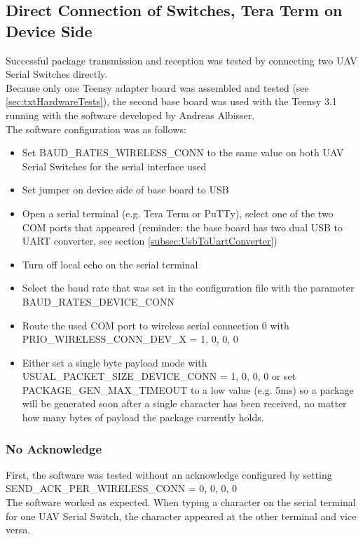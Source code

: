 \subsection{Direct Connection of Switches, Tera Term on Device Side} \label{subsec:txtTestDirectConnTeraTerm}
%
Successful package transmission and reception was tested by connecting two UAV Serial Switches directly.\\
Because only one Teensy adapter board was assembled and tested (see \autoref{sec:txtHardwareTests}), the second base board was used with the Teensy 3.1 running with the software developed by Andreas Albisser.\\
The software configuration was as follows:
\begin{itemize}
    \item Set BAUD\_RATES\_WIRELESS\_CONN to the same value on both UAV Serial Switches for the serial interface used
    \item Set jumper on device side of base board to USB
    \item Open a serial terminal (e.g. Tera Term or PuTTy), select one of the two COM ports that appeared (reminder: the base board has two dual USB to UART converter, see section \ref{subsec:UsbToUartConverter})
    \item Turn off local echo on the serial terminal
    \item Select the baud rate that was set in the configuration file with the parameter BAUD\_RATES\_DEVICE\_CONN
    \item Route the used COM port to wireless serial connection 0 with PRIO\_WIRELESS\_CONN\_DEV\_X = 1, 0, 0, 0
    \item Either set a single byte payload mode with USUAL\_PACKET\_SIZE\_DEVICE\_CONN = 1, 0, 0, 0 or set PACKAGE\_GEN\_MAX\_TIMEOUT to a low value (e.g. 5ms) so a package will be generated soon after a single character has been received, no matter how many bytes of payload the package currently holds.
\end{itemize}
%
\subsubsection{No Acknowledge}
First, the software was tested without an acknowledge configured by setting SEND\_ACK\_PER\_WIRELESS\_CONN = 0, 0, 0, 0\\
The software worked as expected. When typing a character on the serial terminal for one UAV Serial Switch, the character appeared at the other terminal and vice versa.
%
